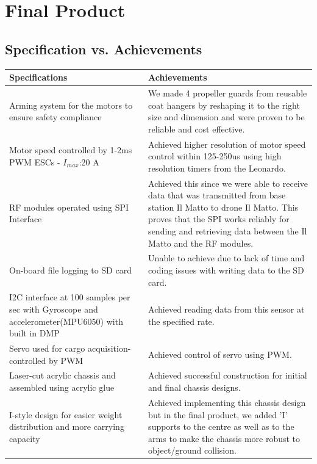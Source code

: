 \documentclass[a4paper,11pt]{article}
\begin{document}
\newpage
\section{Final Product}
\subsection{Specification vs. Achievements}
\begin{center}
  \begin{table}[!htp]
    \begin{tabular}{|m{5cm}|m{8cm}|}
    \hline
     Specifications & Achievements \\
     \hline
     Arming system for the motors to ensure safety compliance &  We made 4 propeller guards from reusable coat hangers by reshaping it to the right size and dimension and were proven to be reliable and cost effective.\\
    \hline
    Motor speed controlled by 1-2ms PWM ESCs - $I_{max}$:20 A & Achieved higher resolution of motor speed control within 125-250us using high resolution timers from the Leonardo.\\
    \hline
    RF modules operated using SPI Interface & %
    Achieved this since we were able to receive data that was transmitted from base station Il Matto to drone Il Matto. This proves that the SPI works reliably for sending and retrieving data between the Il Matto and the RF modules.\\
    \hline
    On-board file logging to SD card & Unable to achieve due to lack of time and coding issues with writing data to the SD card. \\
    \hline
    I2C interface at 100 samples per sec with Gyroscope and accelerometer(MPU6050) with built in DMP & Achieved reading data from this sensor at the specified rate.  \\
    \hline
    Servo used for cargo acquisition- controlled by PWM & Achieved control of servo using PWM. \\
    \hline
    Laser-cut acrylic chassis and assembled using acrylic glue & Achieved successful construction for initial and final chassis designs. \\
    \hline 
    I-style design for easier weight distribution and more carrying capacity & Achieved implementing this chassis design but in the final product, we added 'I' supports to the centre as well as to the arms to make the chassis more robust to object/ground collision. \\

\end{tabular}
\end{table}
\end{center}
\end{document}

